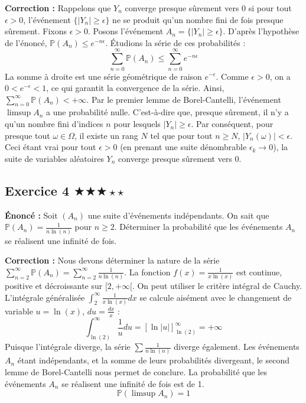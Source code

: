 \documentclass[11pt,a4paper]{article}
\begin{document}
\textbf{Correction :}
Rappelons que $Y_n$ converge presque sûrement vers 0 si pour tout $\epsilon > 0$, l'événement $\{|Y_n| \ge \epsilon\}$ ne se produit qu'un nombre fini de fois presque sûrement.
Fixons $\epsilon > 0$.
Posons l'événement $A_n = \{|Y_n| \ge \epsilon\}$.
D'après l'hypothèse de l'énoncé, $\mathbb{P}(A_n) \le e^{-n\epsilon}$.
Étudions la série de ces probabilités :
$$ \sum_{n=0}^\infty \mathbb{P}(A_n) \le \sum_{n=0}^\infty e^{-n\epsilon} $$
La somme à droite est une série géométrique de raison $e^{-\epsilon}$. Comme $\epsilon > 0$, on a $0 < e^{-\epsilon} < 1$, ce qui garantit la convergence de la série.
Ainsi, $\sum_{n=0}^\infty \mathbb{P}(A_n) < +\infty$.
Par le premier lemme de Borel-Cantelli, l'événement $\limsup A_n$ a une probabilité nulle.
C'est-à-dire que, presque sûrement, il n'y a qu'un nombre fini d'indices $n$ pour lesquels $|Y_n| \ge \epsilon$.
Par conséquent, pour presque tout $\omega \in \Omega$, il existe un rang $N$ tel que pour tout $n \ge N$, $|Y_n(\omega)| < \epsilon$.
Ceci étant vrai pour tout $\epsilon > 0$ (en prenant une suite dénombrable $\epsilon_k \to 0$), la suite de variables aléatoires $Y_n$ converge presque sûrement vers 0.


\subsection*{Exercice 4 \quad $\bigstar\bigstar\bigstar\star\star$}


\textbf{Énoncé :}
Soit $(A_n)$ une suite d'événements indépendants. On sait que $\mathbb{P}(A_n) = \frac{1}{n \ln(n)}$ pour $n \ge 2$.
Déterminer la probabilité que les événements $A_n$ se réalisent une infinité de fois.

\textbf{Correction :}
Nous devons déterminer la nature de la série $\sum_{n=2}^\infty \mathbb{P}(A_n) = \sum_{n=2}^\infty \frac{1}{n \ln(n)}$.
La fonction $f(x) = \frac{1}{x \ln(x)}$ est continue, positive et décroissante sur $[2, +\infty[$.
On peut utiliser le critère intégral de Cauchy.
L'intégrale généralisée $\int_2^\infty \frac{1}{x \ln(x)} dx$ se calcule aisément avec le changement de variable $u = \ln(x)$, $du = \frac{dx}{x}$ :
$$ \int_{\ln(2)}^\infty \frac{1}{u} du = \left[ \ln|u| \right]_{\ln(2)}^\infty = +\infty $$
Puisque l'intégrale diverge, la série $\sum \frac{1}{n \ln(n)}$ diverge également.
Les événements $A_n$ étant indépendants, et la somme de leurs probabilités divergeant, le second lemme de Borel-Cantelli nous permet de conclure.
La probabilité que les événements $A_n$ se réalisent une infinité de fois est de 1.
$$ \mathbb{P}(\limsup A_n) = 1 $$
\end{document}
